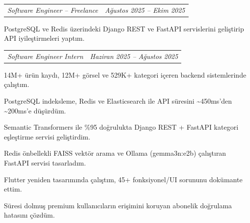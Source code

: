 \documentclass[10pt,a4paper]{extarticle}
\makeatletter
\newcommand{\ca}{\textasciitilde}
\newcommand{\subentry}[2]{%
\noindent\begin{tabular*}{\textwidth}{@{\extracolsep{\fill}}lr}
\textit{\color{muted}#1} & \textit{\color{muted}#2}\\
\end{tabular*}\vspace{2pt}
}
\makeatother
\begin{document}
\vspace{1pt}
\subentry{Software Engineer -- Freelance}{Ağustos 2025 -- Ekim 2025}
\begin{bullets}
\item PostgreSQL ve Redis üzerindeki Django REST ve FastAPI servislerini geliştirip API iyileştirmeleri yaptım.
\end{bullets}

\vspace{1pt}
\subentry{Software Engineer Intern}{Haziran 2025 -- Ağustos 2025}
\begin{bullets}
\item 14M+ ürün kaydı, 12M+ görsel ve 529K+ kategori içeren backend sistemlerinde çalıştım.
\item PostgreSQL indeksleme, Redis ve Elasticsearch ile API süresini \ca{}450ms'den \ca{}200ms'e düşürdüm.
\item Semantic Transformers ile \%95 doğrulukta Django REST + FastAPI kategori eşleştirme servisi geliştirdim.
\item Redis önbellekli FAISS vektör arama ve Ollama (gemma3n:e2b) çalıştıran FastAPI servisi tasarladım.
\item Flutter yeniden tasarımında çalıştım, 45+ fonksiyonel/UI sorununu dokümante ettim.
\item Süresi dolmuş premium kullanıcıların erişimini koruyan abonelik doğrulama hatasını çözdüm.
\end{bullets}

\end{document}
